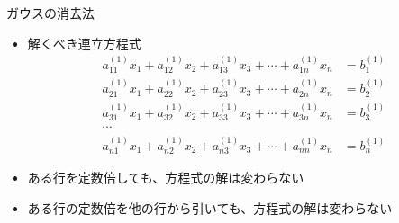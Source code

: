 \begin{frame}[t,fragile]{ガウスの消去法}
  \begin{itemize}
  \item 解くべき連立方程式
    \begin{align*}
    a_{11}^{(1)} x_1 + a_{12}^{(1)} x_2 + a_{13}^{(1)} x_3 + \cdots + a_{1n}^{(1)} x_n &= b_{1}^{(1)} \\
    a_{21}^{(1)} x_1 + a_{22}^{(1)} x_2 + a_{23}^{(1)} x_3 + \cdots + a_{2n}^{(1)} x_n &= b_{2}^{(1)} \\
    a_{31}^{(1)} x_1 + a_{32}^{(1)} x_2 + a_{33}^{(1)} x_3 + \cdots + a_{3n}^{(1)} x_n &= b_{3}^{(1)} \\
    \cdots \\
    a_{n1}^{(1)} x_1 + a_{n2}^{(1)} x_2 + a_{n3}^{(1)} x_3 + \cdots + a_{nn}^{(1)} x_n &= b_{n}^{(1)}
    \end{align*}
  \item ある行を定数倍しても、方程式の解は変わらない
  \item ある行の定数倍を他の行から引いても、方程式の解は変わらない
  \end{itemize}
\end{frame}
